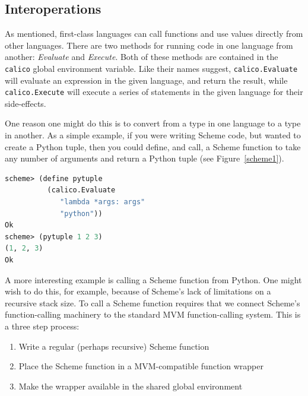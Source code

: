 \documentclass[preprint]{sigplanconf}
\begin{document}
\subsection{Interoperations}

As mentioned, first-class languages can call functions and use values
directly from other languages. There are two methods for running code
in one language from another: \textit{Evaluate} and
\textit{Execute}. Both of these methods are contained in the
\texttt{calico} global environment variable. Like their names suggest,
\texttt{calico.Evaluate} will evaluate an expression in the given
language, and return the result, while \texttt{calico.Execute} will
execute a series of statements in the given language for their
side-effects.

One reason one might do this is to convert from a type in one language
to a type in another. As a simple example, if you were writing Scheme
code, but wanted to create a Python tuple, then you could define, and
call, a Scheme function to take any number of arguments and return a
Python tuple (see Figure~\ref{scheme1}).

\begin{lstlisting}[language=Lisp, morekeywords={define}, caption={Defining a function \texttt{pytuple} in 
      Calico Scheme that directly uses Calico Python's lambda to construct a Python tuple. Notice     
      that in line 7 that the tuple's displayed representation reflects the style
      from Python rather than Scheme's.}, label={scheme1}]
scheme> (define pytuple 
          (calico.Evaluate 
             "lambda *args: args" 
             "python"))
Ok
scheme> (pytuple 1 2 3)
(1, 2, 3)
Ok
\end{lstlisting}

A more interesting example is calling a Scheme function from
Python. One might wish to do this, for example, because of Scheme's
lack of limitations on a recursive stack size. To call a Scheme
function requires that we connect Scheme's function-calling machinery
to the standard MVM function-calling system. This is a three step
process:

\begin{enumerate}
\item Write a regular (perhaps recursive) Scheme function 
\item Place the Scheme function in a MVM-compatible function wrapper
\item Make the wrapper available in the shared global environment
\end{enumerate}
\end{document}
